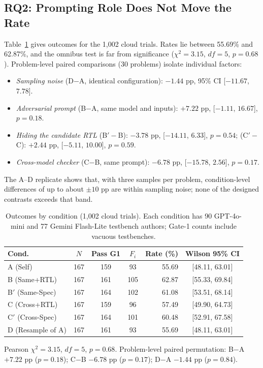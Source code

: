 \documentclass[conference]{IEEEtran}
\begin{document}
\subsection{RQ2: Prompting Role Does Not Move the Rate}
Table~\ref{tab:conditions} gives outcomes for the 1,002 cloud trials. Rates lie between 55.69\% and 62.87\%, and the omnibus test is far from significance ($\chi^2 = 3.15$, $df = 5$, $p = 0.68$). Problem-level paired comparisons (30 problems) isolate individual factors:
\begin{itemize}
    \item \textit{Sampling noise} (D$-$A, identical configuration): $-1.44$ pp, 95\% CI [$-11.67$, $7.78$].
    \item \textit{Adversarial prompt} (B$-$A, same model and inputs): $+7.22$ pp, [$-1.11$, $16.67$], $p = 0.18$.
    \item \textit{Hiding the candidate RTL} (B$'-$B): $-3.78$ pp, [$-14.11$, $6.33$], $p = 0.54$; (C$'-$C): $+2.44$ pp, [$-5.11$, $10.00$], $p = 0.59$.
    \item \textit{Cross-model checker} (C$-$B, same prompt): $-6.78$ pp, [$-15.78$, $2.56$], $p = 0.17$.
\end{itemize}
The A--D replicate shows that, with three samples per problem, condition-level differences of up to about $\pm 10$ pp are within sampling noise; none of the designed contrasts exceeds that band.

\begin{table}[t]
\centering
\caption{Outcomes by condition (1,002 cloud trials). Each condition has 90 GPT-4o-mini and 77 Gemini Flash-Lite testbench authors; Gate-1 counts include vacuous testbenches.}
\label{tab:conditions}
\footnotesize
\setlength{\tabcolsep}{3pt}
\begin{tabular}{lcccrc}
\toprule
\textbf{Cond.} & \textbf{$N$} & \textbf{Pass G1} & \textbf{$F_i$} & \textbf{Rate (\%)} & \textbf{Wilson 95\% CI} \\
\midrule
A (Self)          & 167 & 159 & 93  & 55.69 & [48.11, 63.01] \\
B (Same+RTL)      & 167 & 161 & 105 & 62.87 & [55.33, 69.84] \\
B$'$ (Same-Spec)  & 167 & 164 & 102 & 61.08 & [53.51, 68.14] \\
C (Cross+RTL)     & 167 & 159 & 96  & 57.49 & [49.90, 64.73] \\
C$'$ (Cross-Spec) & 167 & 164 & 101 & 60.48 & [52.91, 67.58] \\
D (Resample of A) & 167 & 161 & 93  & 55.69 & [48.11, 63.01] \\
\bottomrule
\end{tabular}

\vspace{3pt}
\begin{minipage}{0.96\columnwidth}
\scriptsize
Pearson $\chi^2 = 3.15$, $df = 5$, $p = 0.68$. Problem-level paired permutation: B$-$A $+7.22$ pp ($p = 0.18$); C$-$B $-6.78$ pp ($p = 0.17$); D$-$A $-1.44$ pp ($p = 0.84$).
\end{minipage}
\end{table}
\end{document}
